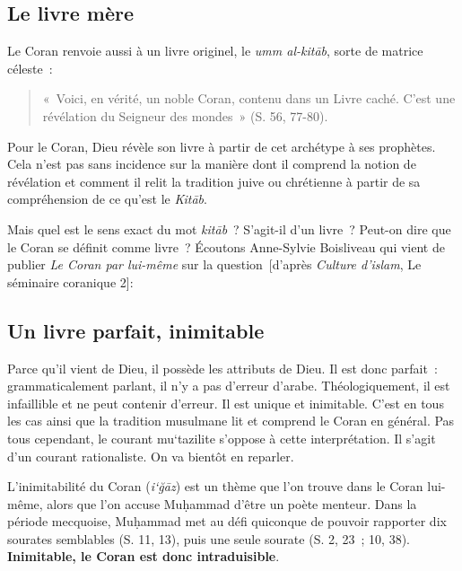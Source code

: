 \subsection{Le livre mère
}

Le Coran renvoie aussi à un livre originel, le \emph{umm al-kitāb},
sorte de matrice céleste~:
\begin{quote}
    

«~Voici, en vérité, un noble Coran, contenu dans un Livre caché. C'est
une révélation du Seigneur des mondes~» (S. 56, 77-80).
\end{quote}
Pour le Coran, Dieu révèle son livre à partir de cet archétype à ses
prophètes. Cela n'est pas sans incidence sur la manière dont il comprend
la notion de révélation et comment il relit la tradition juive ou
chrétienne à partir de sa compréhension de ce qu'est le \emph{Kitāb}.

Mais quel est le sens exact du mot \emph{kitāb}~? S'agit-il d'un livre~?
Peut-on dire que le Coran se définit comme livre~? Écoutons Anne-Sylvie
Boisliveau qui vient de publier \emph{Le Coran par lui-même} sur la
question~{[}d'après \emph{Culture d'islam}, Le séminaire coranique 2{]}:






\subsection{{Un livre parfait, inimitable
}}

Parce qu'il vient de Dieu, il possède les attributs de Dieu. Il est donc
parfait~: grammaticalement parlant, il n'y a pas d'erreur d'arabe.
Théologiquement, il est infaillible et ne peut contenir d'erreur. Il est
unique et inimitable. C'est en tous les cas ainsi que la tradition
musulmane lit et comprend le Coran en général. Pas tous cependant, le
courant mu`tazilite s'oppose à cette interprétation. Il s'agit d'un
courant rationaliste. On va bientôt en reparler.

L'inimitabilité du Coran (\emph{i`ğāz}) est un thème que l'on trouve
dans le Coran lui-même, alors que l'on accuse Muḥammad d'être un poète
menteur. Dans la période mecquoise, Muḥammad met au défi quiconque de
pouvoir rapporter dix sourates semblables (S. 11, 13), puis une seule
sourate (S. 2, 23~; 10, 38). \textbf{Inimitable, le Coran est donc
intraduisible}.

